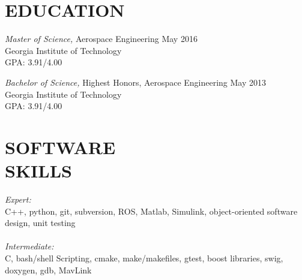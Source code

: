 \documentclass[margin]{resume} %
\begin{document}
\begin{resume}
\section{EDUCATION}
{\sl Master of Science,} Aerospace Engineering \hfill May 2016 \\
Georgia Institute of Technology \\
GPA: 3.91/4.00

{\sl Bachelor of Science,} Highest Honors, Aerospace Engineering \hfill May 2013 \\
Georgia Institute of Technology \\
GPA: 3.91/4.00


\section{SOFTWARE \\ SKILLS} 

{\sl Expert:} \\
C++, python, git, subversion, ROS, Matlab, Simulink, object-oriented software design, unit testing \\ \\
{\sl Intermediate:} \\
C, bash/shell Scripting, cmake, make/makefiles, gtest, boost libraries, swig, doxygen, gdb, MavLink
 




\end{resume}
\end{document}
